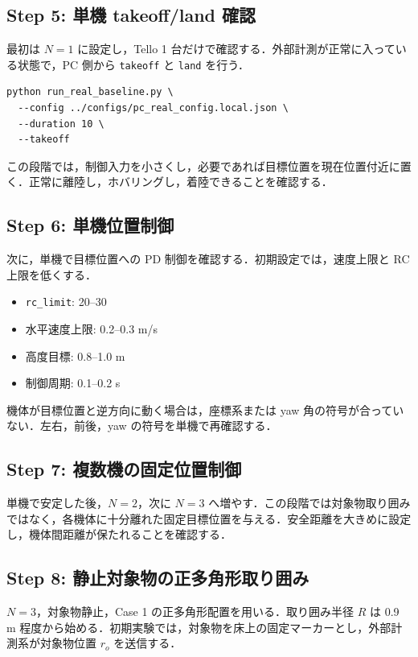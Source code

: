 \subsection{Step 5: 単機 takeoff/land 確認}

最初は $N=1$ に設定し，Tello 1 台だけで確認する．外部計測が正常に入っている状態で，PC 側から \texttt{takeoff} と \texttt{land} を行う．

\begin{lstlisting}
python run_real_baseline.py \
  --config ../configs/pc_real_config.local.json \
  --duration 10 \
  --takeoff
\end{lstlisting}

この段階では，制御入力を小さくし，必要であれば目標位置を現在位置付近に置く．正常に離陸し，ホバリングし，着陸できることを確認する．

\subsection{Step 6: 単機位置制御}

次に，単機で目標位置への PD 制御を確認する．初期設定では，速度上限と RC 上限を低くする．

\begin{itemize}
  \item \texttt{rc\_limit}: 20--30
  \item 水平速度上限: 0.2--0.3 m/s
  \item 高度目標: 0.8--1.0 m
  \item 制御周期: 0.1--0.2 s
\end{itemize}

機体が目標位置と逆方向に動く場合は，座標系または yaw 角の符号が合っていない．左右，前後，yaw の符号を単機で再確認する．

\subsection{Step 7: 複数機の固定位置制御}

単機で安定した後，$N=2$，次に $N=3$ へ増やす．この段階では対象物取り囲みではなく，各機体に十分離れた固定目標位置を与える．安全距離を大きめに設定し，機体間距離が保たれることを確認する．

\subsection{Step 8: 静止対象物の正多角形取り囲み}

$N=3$，対象物静止，Case 1 の正多角形配置を用いる．取り囲み半径 $R$ は 0.9 m 程度から始める．初期実験では，対象物を床上の固定マーカーとし，外部計測系が対象物位置 $r_o$ を送信する．

